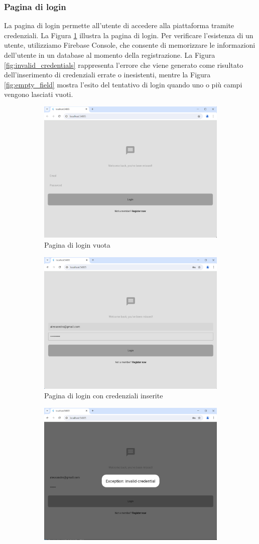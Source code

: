 \subsubsection{Pagina di login}
La pagina di login permette all'utente di accedere alla piattaforma tramite credenziali.
La Figura \ref{fig:login-page} illustra la pagina di login. Per verificare l'esistenza di un utente, utilizziamo Firebase Console, che consente di memorizzare le informazioni dell'utente in un database al momento della registrazione. La Figura \ref{fig:invalid_credentials} rappresenta l'errore che viene generato come risultato dell'inserimento di credenziali errate o inesistenti, mentre la Figura \ref{fig:empty_field} mostra l'esito del tentativo di login quando uno o più campi vengono lasciati vuoti.
\begin{figure}[H]
	\centering
	\begin{subfigure}{.5\textwidth}
		\centering
		\includegraphics[width=0.45\linewidth]{Immagini/login_page.png}
		\caption{Pagina di login vuota\newline}
		\label{fig:login-page}
	\end{subfigure}%
	\begin{subfigure}{.5\textwidth}
		\centering
		\includegraphics[width=0.45\linewidth]{Immagini/login_page_credentials.png}
		\caption{Pagina di login con credenziali inserite\newline}
		\label{fig:credential_login_page}
	\end{subfigure}
	\begin{subfigure}{.5\textwidth}
		\centering
		\includegraphics[width=0.45\linewidth]{Immagini/invalid_credentials.png}

\end{subfigure}
\end{figure}
